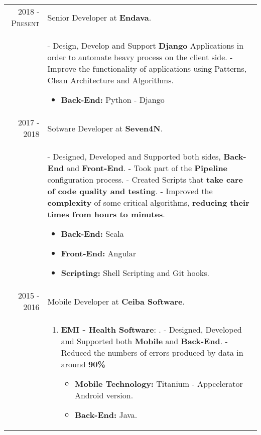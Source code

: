 \documentclass[a4paper,11pt]{article} %
\begin{document}
\begin{tabular}{r|p{12cm}}
\textsc{2018 - Present} & Senior Developer at \textbf{Endava}.\\
\newline
& \footnotesize{
- Design, Develop and Support \textbf{Django} Applications in order to automate heavy process on the client side.\newline
- Improve the functionality of applications using Patterns, Clean Architecture and Algorithms. 
\begin{itemize}
\item \textbf{Back-End:} Python - Django
\end{itemize}}\\

\textsc{2017 - 2018} & Sotware Developer at \textbf{Seven4N}.\\
& \footnotesize{
- Designed, Developed and Supported both sides, \textbf{Back-End} and \textbf{Front-End}. \newline
- Took part of the \textbf{Pipeline} configuration process.\newline
- Created Scripts that \textbf{take care of code quality and testing}. \newline
- Improved the \textbf{complexity} of some critical algorithms, \textbf{reducing their times from hours to minutes}. 
\begin{itemize}
\item \textbf{Back-End:} Scala
\item \textbf{Front-End:} Angular
\item \textbf{Scripting:} Shell Scripting and Git hooks.
\end{itemize}}\\
\textsc{2015 - 2016} & Mobile Developer at \textbf{Ceiba Software}.\\
& \footnotesize{
\begin{enumerate}
\item \textbf{EMI - Health Software}: .\newline
- Designed, Developed and Supported both \textbf{Mobile} and \textbf{Back-End}.\newline
- Reduced the numbers of errors produced by data in around \textbf{90\%}
\begin{itemize}
\item \textbf{Mobile Technology:} Titanium - Appcelerator Android version.
\item \textbf{Back-End:} Java.
\end{itemize}

\end{enumerate}}
\end{tabular}
\end{document}
